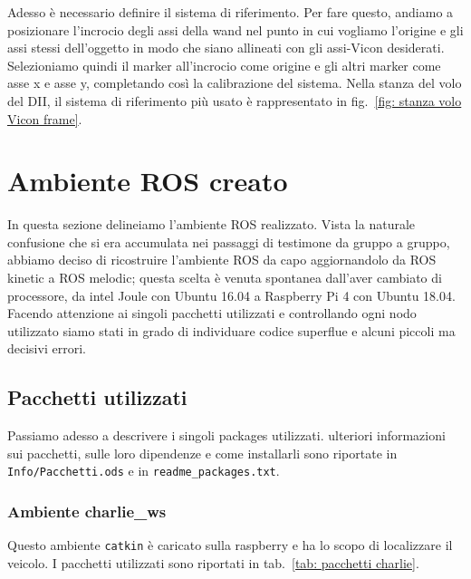 Adesso è necessario definire il sistema di riferimento. Per fare questo, andiamo a posizionare l'incrocio degli assi della wand nel punto in cui vogliamo l'origine e gli assi stessi dell'oggetto in modo che siano allineati con gli assi-Vicon desiderati.
Selezioniamo quindi il marker all'incrocio come origine e gli altri marker come asse x e asse y, completando così la calibrazione del sistema. 
Nella stanza del volo del DII, il sistema di riferimento più usato è rappresentato in fig.~\ref{fig: stanza volo Vicon frame}.




\newpage
\section{Ambiente ROS creato}
\label{sez:Ambiente ROS creato}
In questa sezione delineiamo l'ambiente ROS realizzato. 
Vista la naturale confusione che si era accumulata nei passaggi di testimone da gruppo a gruppo, abbiamo deciso di ricostruire l'ambiente ROS da capo aggiornandolo da ROS kinetic a ROS melodic; questa scelta \`e venuta spontanea dall'aver cambiato di processore, da intel Joule con Ubuntu 16.04 a Raspberry Pi 4 con Ubuntu 18.04.
Facendo attenzione ai singoli pacchetti utilizzati e controllando ogni nodo utilizzato siamo stati in grado di individuare codice superflue e alcuni piccoli ma decisivi errori.

\subsection{Pacchetti utilizzati}
\label{sez:ambiente ROS, pacchetti}
Passiamo adesso a descrivere i singoli packages utilizzati.
ulteriori informazioni  sui pacchetti, sulle loro dipendenze e come installarli sono riportate in \verb|Info/Pacchetti.ods| e in \verb|readme_packages.txt|.
\subsubsection*{Ambiente charlie\_ws}
Questo ambiente \verb|catkin| \`e caricato sulla raspberry e ha lo scopo di localizzare il veicolo.
I pacchetti utilizzati sono riportati in tab.~\ref{tab: pacchetti charlie}.

